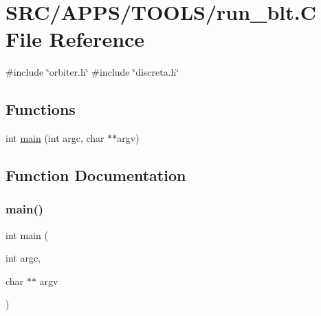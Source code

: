 \hypertarget{run__blt_8_c}{}\section{S\+R\+C/\+A\+P\+P\+S/\+T\+O\+O\+L\+S/run\+\_\+blt.C File Reference}
\label{run__blt_8_c}
{\ttfamily \#include \char`\"{}orbiter.\+h\char`\"{}}\newline
{\ttfamily \#include \char`\"{}discreta.\+h\char`\"{}}\newline
\subsection*{Functions}
\begin{DoxyCompactItemize}
\item 
int \mbox{\hyperlink{run__blt_8_c_a3c04138a5bfe5d72780bb7e82a18e627}{main}} (int argc, char $\ast$$\ast$argv)
\end{DoxyCompactItemize}


\subsection{Function Documentation}
\mbox{\label{run__blt_8_c_a3c04138a5bfe5d72780bb7e82a18e627}} 
\subsubsection{\texorpdfstring{main()}{main()}}
{\footnotesize\ttfamily int main (\begin{DoxyParamCaption}\item[{int}]{argc,  }\item[{char $\ast$$\ast$}]{argv }\end{DoxyParamCaption})}

